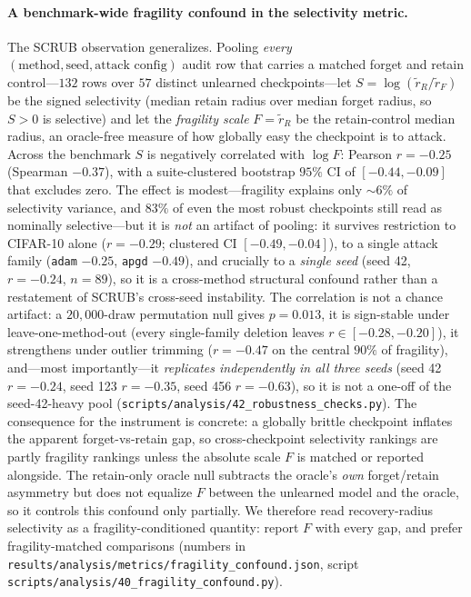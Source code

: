 \documentclass[11pt]{article}
\begin{document}
\paragraph{A benchmark-wide fragility confound in the selectivity metric.} The SCRUB observation generalizes. Pooling \emph{every} $(\text{method},\text{seed},\text{attack config})$ audit row that carries a matched forget and retain control---$132$ rows over $57$ distinct unlearned checkpoints---let $S = \log(\tilde r_R / \tilde r_F)$ be the signed selectivity (median retain radius over median forget radius, so $S>0$ is selective) and let the \emph{fragility scale} $F = \tilde r_R$ be the retain-control median radius, an oracle-free measure of how globally easy the checkpoint is to attack. Across the benchmark $S$ is negatively correlated with $\log F$: Pearson $r = -0.25$ (Spearman $-0.37$), with a suite-clustered bootstrap $95\%$ CI of $[-0.44,-0.09]$ that excludes zero. The effect is modest---fragility explains only $\sim\!6\%$ of selectivity variance, and $83\%$ of even the most robust checkpoints still read as nominally selective---but it is \emph{not} an artifact of pooling: it survives restriction to CIFAR-10 alone ($r=-0.29$; clustered CI $[-0.49,-0.04]$), to a single attack family (\texttt{adam} $-0.25$, \texttt{apgd} $-0.49$), and crucially to a \emph{single seed} (seed 42, $r=-0.24$, $n=89$), so it is a cross-method structural confound rather than a restatement of SCRUB's cross-seed instability. The correlation is not a chance artifact: a $20{,}000$-draw permutation null gives $p = 0.013$, it is sign-stable under leave-one-method-out (every single-family deletion leaves $r \in [-0.28,-0.20]$), it strengthens under outlier trimming ($r=-0.47$ on the central $90\%$ of fragility), and---most importantly---it \emph{replicates independently in all three seeds} (seed 42 $r=-0.24$, seed 123 $r=-0.35$, seed 456 $r=-0.63$), so it is not a one-off of the seed-42-heavy pool (\texttt{scripts/analysis/42\_robustness\_checks.py}). The consequence for the instrument is concrete: a globally brittle checkpoint inflates the apparent forget-vs-retain gap, so cross-checkpoint selectivity rankings are partly fragility rankings unless the absolute scale $F$ is matched or reported alongside. The retain-only oracle null subtracts the oracle's \emph{own} forget/retain asymmetry but does not equalize $F$ between the unlearned model and the oracle, so it controls this confound only partially. We therefore read recovery-radius selectivity as a fragility-conditioned quantity: report $F$ with every gap, and prefer fragility-matched comparisons (numbers in \texttt{results/analysis/metrics/fragility\_confound.json}, script \texttt{scripts/analysis/40\_fragility\_confound.py}).
\end{document}
